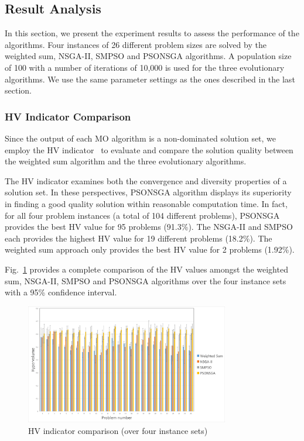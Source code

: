 \documentclass[10pt,journal,compsoc]{IEEEtran}
\newcommand{\Fig}[1]{Fig.~\ref{#1}}
\begin{document}
\subsection{Result Analysis}\label{resultanalyssi}
In this section, we present the experiment results to assess the performance of the algorithms.
Four instances of 26 different problem sizes are solved by the weighted sum, NSGA-II, SMPSO and PSONSGA algorithms. %
A population size of 100 with a number of iterations of 10,000 is used for the three evolutionary algorithms. We use the same parameter settings as the ones described in the last section. %


\subsubsection{HV Indicator Comparison}
Since the output of each MO algorithm is a non-dominated solution set, we employ the HV indicator~\cite{Auger:2009:THI:1527125.1527138} to evaluate and compare the solution quality between the weighted sum algorithm and the three evolutionary algorithms. 

The HV indicator examines both the convergence and diversity properties of a solution set. In these perspectives, PSONSGA algorithm displays its superiority in finding a good quality solution within reasonable computation time. In fact, for all four problem instances (a total of 104 different problems), PSONSGA provides the best HV value for 95 problems (91.3\%). The NSGA-II and SMPSO each provides the highest HV value for 19 different problems (18.2\%). The weighted sum approach only provides the best HV value for 2 problems (1.92\%).

\Fig{hvaverage} provides a complete comparison of the HV values amongst the weighted sum, NSGA-II, SMPSO and PSONSGA algorithms over the four instance sets with a 95\% confidence interval.

\begin{figure}[ht]
\centerline{\includegraphics[page=1,width=3.5in]{hvaverageoverfour.png}}
\caption{HV indicator comparison (over four instance sets)} 
\label{hvaverage}
\end{figure}
\end{document}

